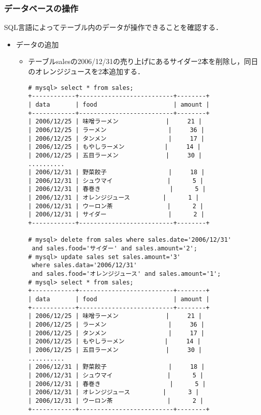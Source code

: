 \documentclass[a4j,titlepage]{jarticle}
\begin{document}
\begin{itemize}
\subsubsection{データベースの操作}

SQL言語によってテーブル内のデータが操作できることを確認する．

\begin{itemize}
\item データの追加

\begin{itemize}
\item テーブルsalesの2006/12/31の売り上げにあるサイダー2本を削除し，同日のオレンジジュースを2本追加する．

\begin{center}
\begin{screen}
\begin{verbatim}
# mysql> select * from sales;
+------------+--------------------------+--------+
| data       | food                     | amount |
+------------+--------------------------+--------+
| 2006/12/25 | 味噌ラーメン             |     21 |
| 2006/12/25 | ラーメン                 |     36 |
| 2006/12/25 | タンメン                 |     17 |
| 2006/12/25 | もやしラーメン           |     14 |
| 2006/12/25 | 五目ラーメン             |     30 |
..........
| 2006/12/31 | 野菜餃子                 |     18 |
| 2006/12/31 | シュウマイ               |      5 |
| 2006/12/31 | 春巻き                   |      5 |
| 2006/12/31 | オレンジジュース         |      1 |
| 2006/12/31 | ウーロン茶               |      2 |
| 2006/12/31 | サイダー                 |      2 |
+------------+--------------------------+--------+

# mysql> delete from sales where sales.date='2006/12/31'
 and sales.food='サイダー' and sales.amount='2';
# mysql> update sales set sales.amount='3' 
 where sales.data='2006/12/31'
 and sales.food='オレンジジュース' and sales.amount='1';
# mysql> select * from sales;
+------------+--------------------------+--------+
| data       | food                     | amount |
+------------+--------------------------+--------+
| 2006/12/25 | 味噌ラーメン             |     21 |
| 2006/12/25 | ラーメン                 |     36 |
| 2006/12/25 | タンメン                 |     17 |
| 2006/12/25 | もやしラーメン           |     14 |
| 2006/12/25 | 五目ラーメン             |     30 |
..........
| 2006/12/31 | 野菜餃子                 |     18 |
| 2006/12/31 | シュウマイ               |      5 |
| 2006/12/31 | 春巻き                   |      5 |
| 2006/12/31 | オレンジジュース         |      3 |
| 2006/12/31 | ウーロン茶               |      2 |
+------------+--------------------------+--------+
\end{verbatim}
\end{screen}
\end{center}



\end{itemize}
\end{itemize}
\end{itemize}
\end{document}
